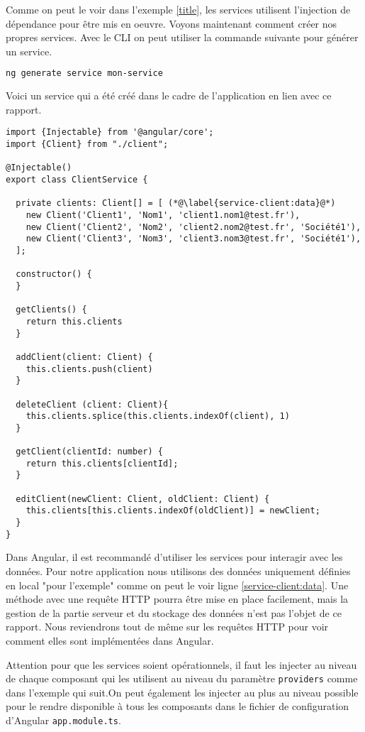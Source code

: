 Comme on peut le voir dans l'exemple \ref{title}, les services utilisent l'injection de dépendance pour être mis en oeuvre. Voyons maintenant comment créer nos propres services. Avec le CLI on peut utiliser la commande suivante pour générer un service.

\begin{lstlisting}[language=bash]
ng generate service mon-service
\end{lstlisting}

Voici un service qui a été créé dans le cadre de l'application en lien avec ce rapport.

\begin{lstlisting}[style=htmlcssjs, caption={Service Client}, label=service-client]
import {Injectable} from '@angular/core';
import {Client} from "./client";

@Injectable()
export class ClientService {

  private clients: Client[] = [ (*@\label{service-client:data}@*)
    new Client('Client1', 'Nom1', 'client1.nom1@test.fr'),
    new Client('Client2', 'Nom2', 'client2.nom2@test.fr', 'Société1'),
    new Client('Client3', 'Nom3', 'client3.nom3@test.fr', 'Société1'),
  ];

  constructor() {
  }

  getClients() { 
    return this.clients
  }

  addClient(client: Client) {
    this.clients.push(client)
  }

  deleteClient (client: Client){
    this.clients.splice(this.clients.indexOf(client), 1)
  }

  getClient(clientId: number) {
    return this.clients[clientId];
  }

  editClient(newClient: Client, oldClient: Client) {
    this.clients[this.clients.indexOf(oldClient)] = newClient;
  }
}
\end{lstlisting}
Dans Angular, il est recommandé d'utiliser les services pour interagir avec les données. Pour notre application nous utilisons des données uniquement définies en local "pour l'exemple" comme on peut le voir ligne \ref{service-client:data}. Une méthode avec une requête HTTP pourra être mise en place facilement, mais la gestion de la partie serveur et du stockage des données n'est pas l'objet de ce rapport. Nous reviendrons tout de même sur les requêtes HTTP pour voir comment elles sont implémentées dans Angular.

Attention pour que les services soient opérationnels, il faut les injecter au niveau de chaque composant qui les utilisent au niveau du paramètre \texttt{providers} comme dans l'exemple qui suit.On peut également les injecter au plus au niveau possible pour le rendre disponible à tous les composants dans le fichier de configuration d'Angular \texttt{app.module.ts}.


